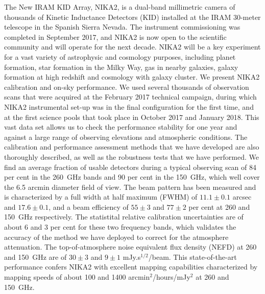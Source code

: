 \documentclass{aa}
\begin{document}
   \abstract
       {The New IRAM KID Array, NIKA2, is a dual-band millimetric camera of thousands of Kinetic
         Inductance Detectors (KID) installed at the IRAM 30-meter
         telescope in the Spanish Sierra Nevada. The instrument
         commissioning  was completed in September 2017, and NIKA2 is now
         open to the scientific community and will operate for the next
         decade. NIKA2 will be a key experiment for a vast variety of
         astrophysic and cosmology purposes, including planet
         formation, star formation in the Milky Way, gas in
         nearby galaxies, galaxy formation at high redshift and
         cosmology with galaxy cluster.}
       {We present NIKA2 calibration and on-sky performance.}
       {We used several
         thousands of observation scans that were acquired at the February
         2017 technical campaign, during which NIKA2 instrumental set-up was
         in the final configuration for the first time,
         and at the first science pools that took place in October 2017 and
         January 2018. This vast data set allows us to check the performance
         stability for one year and against a large range of observing
         elevations and atmospheric conditions. The calibration and
         performance assessment methods that we have developed are also
         thoroughly described, as well as the robustness tests that we have
         performed.}
       {We find an average fraction of usable detectors during a
         typical observing scan of 84 per cent in the 260~GHz bands and 90 per cent in the
         150~GHz, which well cover the 6.5 arcmin diameter field of
         view. The beam pattern has been measured and is characterized
         by a full width at half maximum (FWHM) of $11.1\pm0.1$ arcsec
         and $17.6 \pm 0.1$, and a beam efficiency of $55\pm 3$ and
         $77\pm 2$ per cent at 260 and 150~GHz respectively. The
         statistital relative calibration uncertainties are of about 6
       and 3 per cent for these two frequency bands, which validates
       the accuracy of the method we have deployed to correct for the
       atmosphere attenuation. The top-of-atmosphere noise equivalent
       flux density (NEFD) at 260 and 150~GHz are of $30 \pm 3$ and
       $9 \pm 1$ mJy.s$^{1/2}$/beam. This state-of-the-art performance
       confers NIKA2 with excellent mapping capabilities characterized
       by mapping speeds of about 100 and 1400
       arcmin$^2$/hours/mJy$^2$ at 260 and 150~GHz.}
       {}
\end{document}
